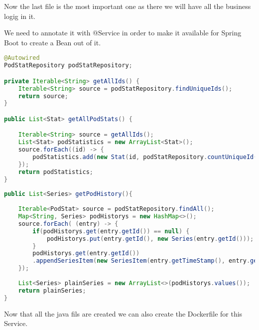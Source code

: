Now the last file is the most important one as there we will have all the business logig in it.

We need to annotate it with @Service in order to make it available for Spring Boot to create a Bean out of it.


\begin{lstlisting}[language=Java]
@Autowired
PodStatRepository podStatRepository;

private Iterable<String> getAllIds() {
	Iterable<String> source = podStatRepository.findUniqueIds();
	return source;
}

public List<Stat> getAllPodStats() {

	Iterable<String> source = getAllIds();
	List<Stat> podStatistics = new ArrayList<Stat>();
	source.forEach((id) -> {
		podStatistics.add(new Stat(id, podStatRepository.countUniqueId(id)));
	});
	return podStatistics;
}
	
public List<Series> getPodHistory(){
		
	Iterable<PodStat> source = podStatRepository.findAll();	
	Map<String, Series> podHistorys = new HashMap<>();	
	source.forEach( (entry) -> {				
		if(podHistorys.get(entry.getId()) == null) {			
			podHistorys.put(entry.getId(), new Series(entry.getId()));			
		}
		podHistorys.get(entry.getId())
		.appendSeriesItem(new SeriesItem(entry.getTimeStamp(), entry.getCounter()));							
	});
		
	List<Series> plainSeries = new ArrayList<>(podHistorys.values());
	return plainSeries;	
}
\end{lstlisting}

Now that all the java fils are created we can also create the Dockerfile for this Service.

